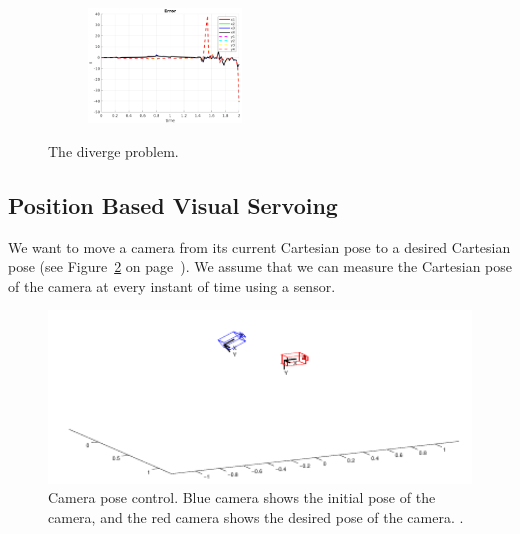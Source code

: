 \documentclass[a4paper,12pt]{article}
\begin{document}
\begin{figure}[tb!]
\begin{subfigure}[b]{0.2\textwidth}
                 \end{subfigure}%
         \begin{subfigure}[b]{0.32\textwidth}
                \centering
                \includegraphics[height=1.2in]{../results/Demo6-error.png}
                 \end{subfigure}%
         \caption{The diverge problem.} 
        \label{fig:demo6} 
\end{figure}
\FloatBarrier
\subsection{Position Based Visual Servoing} 
We want to move a camera from its current Cartesian pose to a desired Cartesian pose (see Figure~\ref{fig:pbvs} on page~\pageref{fig:pbvs}). We
assume that we can measure the Cartesian pose of the camera at every instant of time using a sensor.
\begin{figure}[tb!]
         \centering
         \includegraphics[width=13cm]{../images/PBVS-intro.png}
         \caption{Camera pose control. Blue camera shows the initial pose of the camera, and the red camera
shows the desired pose of the camera.
.}
        \label{fig:pbvs}
\end{figure}
\end{document}
